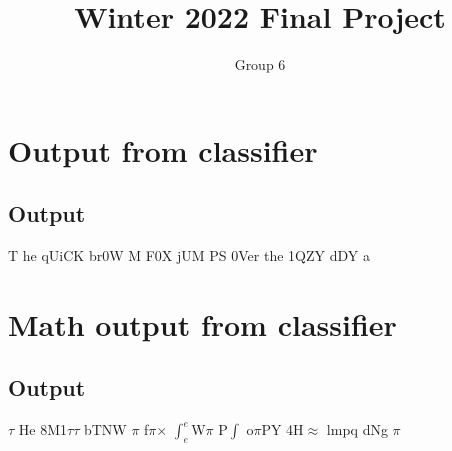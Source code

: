 \documentclass[11pt]{article}
\title{Winter 2022 Final Project}
\author{Group 6}
\begin{document}
\maketitle
\tableofcontents\newpage\newpage
\section{Output from classifier}
\label{section1}
\subsection{Output}
\label{Sec1_L2_Introduction}
T he qUiCK br0W M F0X \newline jUM PS 0Ver the 1QZY dDY \newline a%
\section{Math output from classifier}
\label{section1}
\subsection{Output}
\label{Sec1_L2_Introduction}
$\tau$ He 8M1$\tau$$\tau$ bTNW $\pi$ f$\pi$$\times$ \newline $\int^{e}_{e}$W$\pi$ P$\int$ o$\pi$PY 4H$\approx$ lmpq dNg \newline $\pi$
\end{document}
